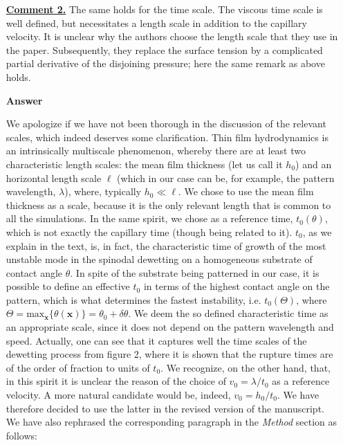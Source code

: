 \documentclass[12pt,english]{article}
\begin{document}
\begin{itemize}
\item[ \textbf{\underline{Comment 2.}}] 
{
The same holds for the time scale. 
The viscous time scale is well defined, but necessitates a length scale in addition to the 
capillary velocity. It is unclear why the authors choose the length scale that they use in the paper.
Subsequently, they replace the surface tension by a complicated partial derivative of the 
disjoining pressure; here the same remark as above holds.
}

\item[ \textbf{{Answer}}]
{
We apologize if we have not been thorough in the discussion of the relevant scales, which indeed deserves some clarification. 
Thin film hydrodynamics is an intrinsically multiscale phenomenon, whereby there are at least two characteristic length scales: the mean film thickness (let us call it $h_0$)
and an horizontal length scale $\ell$ (which in our case can be, for example, the pattern wavelength, $\lambda$), where, typically $h_0 \ll \ell$. We chose to use the mean 
film thickness as a scale, because it is the only relevant length that is common to all the simulations.
In the same spirit, we chose as a reference time, $t_0(\theta)$, which is not exactly the capillary time (though being related to it). 
$t_0$, as we explain in the text, is, in fact, the characteristic time of growth of the most unstable mode in the spinodal dewetting on a homogeneous
substrate of contact angle $\theta$. In spite of the substrate being patterned in our case, it is possible to define an effective $t_0$ in terms 
of the highest contact angle on the pattern, which is what determines the fastest instability, i.e. $t_0(\Theta)$, where 
$\Theta=\mbox{max}_{\mathbf{x}}\{\theta(\mathbf{x})\}= \theta_0 + \delta \theta$. We deem the so defined characteristic time as an appropriate scale,
since it does not depend on the pattern wavelength and speed. Actually, one can see that it captures well the time scales of the dewetting process
from figure 2, where it is shown that the rupture times are of the order of fraction to units of $t_0$.
We recognize, on the other hand, that, in this spirit it is unclear the reason of the choice of $v_0 = \lambda/t_0$ as a reference velocity.
A more natural candidate would be, indeed, $v_0=h_0/t_0$. We have therefore decided to use the latter in the revised version of the manuscript.
We have also rephrased the corresponding paragraph in the {\it Method} section as follows: \\

\textcolor{red}{}

}
\end{itemize}
\end{document}
